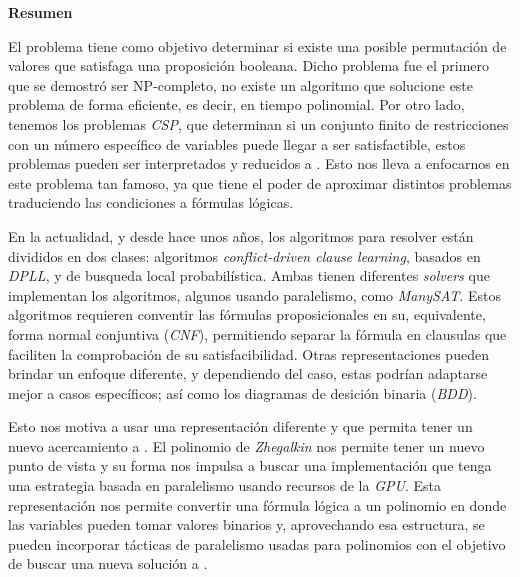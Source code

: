\cleardoublepage
{}
{}
\thispagestyle{pagebottom}
\noindent\textbf{\Huge Resumen}

\vspace{2em}

El problema \sat tiene como objetivo determinar si existe una posible permutación de valores que satisfaga una proposición booleana. Dicho problema fue el primero que se demostró ser NP-completo, no existe un algoritmo que solucione este problema de forma eficiente, es decir, en tiempo polinomial. Por otro lado, tenemos los problemas \textit{CSP}, que determinan si un conjunto finito de restricciones con un número específico de variables puede llegar a ser satisfactible, estos problemas pueden ser interpretados y reducidos a \sat. Esto nos lleva a enfocarnos en este problema tan famoso, ya que tiene el poder de aproximar distintos problemas traduciendo las condiciones a fórmulas lógicas.

En la actualidad, y desde hace unos años, los algoritmos para resolver \sat están divididos en dos clases: algoritmos \textit{conflict-driven clause learning}, basados en \textit{DPLL}, y de busqueda local probabilística. Ambas tienen diferentes \textit{solvers} que implementan los algoritmos, algunos usando paralelismo, como \textit{ManySAT}. Estos algoritmos requieren conventir las fórmulas proposicionales en su, equivalente, forma normal conjuntiva (\textit{CNF}), permitiendo separar la fórmula en clausulas que faciliten la comprobación de su satisfacibilidad. Otras representaciones pueden brindar un enfoque diferente, y dependiendo del caso, estas podrían adaptarse mejor a casos específicos; así como los diagramas de desición binaria (\textit{BDD}).

Esto nos motiva a usar una representación diferente y que permita tener un nuevo acercamiento a \sat. El polinomio de \textit{Zhegalkin} nos permite tener un nuevo punto de vista y su forma nos impulsa a buscar una implementación que tenga una estrategia basada en paralelismo usando recursos de la \textit{GPU}. Esta representación nos permite convertir una fórmula lógica a un polinomio en donde las variables pueden tomar valores binarios y, aprovechando esa estructura, se pueden incorporar tácticas de paralelismo usadas para polinomios con el objetivo de buscar una nueva solución a \sat.

\newpage